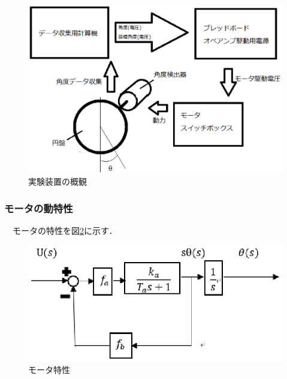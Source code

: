\documentclass{jsarticle}
\begin{document}
   \begin{figure}[bp]
    \begin{center}
     \includegraphics[scale=.5]{./picture/souti.eps}
     \caption{実験装置の概観}
     \label{fig:souti}
    \end{center}
   \end{figure}
   
   \subsubsection{モータの動特性}
　モータの特性を図\ref{fig:tokusei}に示す．
\begin{figure}[b]
 \begin{center}
  \includegraphics[scale=1]{./picture/blocks.eps}
  \caption{モータ特性}
  \label{fig:tokusei}
 \end{center}
\end{figure}
\end{document}

